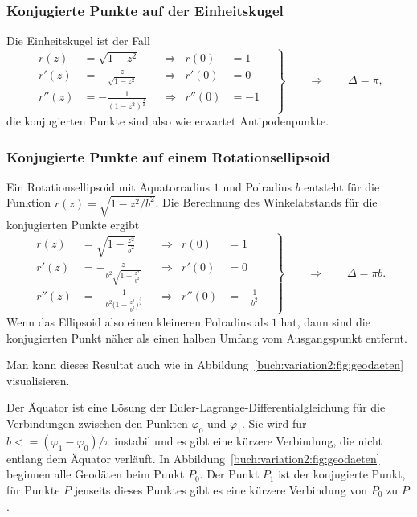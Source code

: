 \subsubsection{Konjugierte Punkte auf der Einheitskugel}
Die Einheitskugel ist der Fall
\begin{equation}
\left.
\begin{aligned}
r(z)
&=
\sqrt{1-z^2}
&&\Rightarrow&
r(0)&=1
\\
r'(z)
&=
-
\frac{z}{\sqrt{1-z^2}}
&&\Rightarrow&
r'(0)&=0
\\
r''(z)
&=
-
\frac{1}{(1-z^2)^{\frac32}}
&&\Rightarrow&
r''(0)&=-1
\end{aligned}
\quad
\right\}
\qquad\Rightarrow\qquad
\Delta
=
\pi,
\end{equation}
die konjugierten Punkte sind also wie erwartet Antipodenpunkte.

%
%
\subsubsection{Konjugierte Punkte auf einem Rotationsellipsoid}
Ein Rotationsellipsoid mit Äquatorradius $1$ und Polradius $b$
entsteht für die Funktion $r(z)=\sqrt{1-z^2/b^2}$.
Die Berechnung des Winkelabstands für die konjugierten Punkte
ergibt
\begin{equation}
\left.
\begin{aligned}
r(z) &= \sqrt{1-\frac{z^2}{b^2}}
&&\Rightarrow&
r(0) &= 1
\\
r'(z) &= -\frac{z}{\displaystyle b^2\sqrt{1-\frac{z^2}{b^2}}}
&&\Rightarrow&
r'(0) &= 0
\\
r''(z)
&=
-\frac{1}{b^2\biggl(\displaystyle1-\frac{z^2}{b^2}\biggr)^{\frac32}}
&&\Rightarrow&
r''(0) &= -\frac{1}{b^2}
\end{aligned}
\quad
\right\}
\qquad\Rightarrow\qquad
\Delta
=
\pi b.
\end{equation}
Wenn das Ellipsoid also einen kleineren Polradius als $1$ hat, dann
sind die konjugierten Punkt näher als einen halben Umfang vom
Ausgangspunkt entfernt.

Man kann dieses Resultat auch wie in
Abbildung~\ref{buch:variation2:fig:geodaeten} visualisieren.

Der Äquator ist eine Lösung der Euler-Lagrange-Differentialgleichung
für die Verbindungen zwischen den Punkten $\varphi_0$ und $\varphi_1$.
Sie wird für $b <= (\varphi_1-\varphi_0)/\pi$ instabil und es gibt
eine kürzere Verbindung, die nicht entlang dem Äquator verläuft.
In Abbildung~\ref{buch:variation2:fig:geodaeten} beginnen alle
Geodäten beim Punkt $P_0$.
Der Punkt $P_1$ ist der konjugierte Punkt, für Punkte $P$ jenseits dieses
Punktes gibt es eine kürzere Verbindung von $P_0$ zu $P$.



